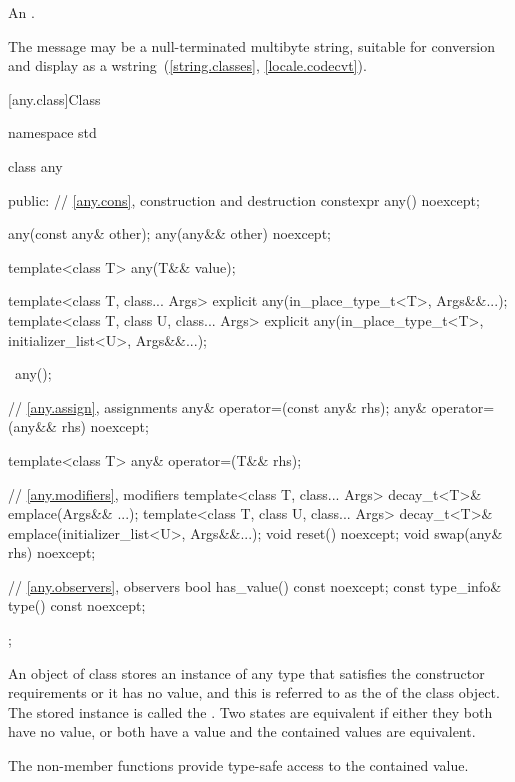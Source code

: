 \begin{itemdescr}
\pnum
\returns An  \ntbs{}.

\pnum
\remarks
The message may be a null-terminated multibyte string,
suitable for conversion and display as a wstring~(\ref{string.classes}, \ref{locale.codecvt}).
\end{itemdescr}

[any.class]{Class }

\begin{codeblock}
namespace std {
  class any {
  public:
    // \ref{any.cons}, construction and destruction
    constexpr any() noexcept;

    any(const any& other);
    any(any&& other) noexcept;

    template<class T>
      any(T&& value);

    template<class T, class... Args>
      explicit any(in_place_type_t<T>, Args&&...);
    template<class T, class U, class... Args>
      explicit any(in_place_type_t<T>, initializer_list<U>, Args&&...);

    ~any();

    // \ref{any.assign}, assignments
    any& operator=(const any& rhs);
    any& operator=(any&& rhs) noexcept;

    template<class T>
      any& operator=(T&& rhs);

    // \ref{any.modifiers}, modifiers
    template<class T, class... Args>
      decay_t<T>& emplace(Args&& ...);
    template<class T, class U, class... Args>
      decay_t<T>& emplace(initializer_list<U>, Args&&...);
    void reset() noexcept;
    void swap(any& rhs) noexcept;

    // \ref{any.observers}, observers
    bool has_value() const noexcept;
    const type_info& type() const noexcept;
  };
}
\end{codeblock}

\pnum
An object of class  stores an instance of any type that satisfies the constructor requirements or it has no value,
and this is referred to as the  of the class  object.
The stored instance is called the .
Two states are equivalent if either they both have no value, or both have a value and the contained values are equivalent.

\pnum
The non-member  functions provide type-safe access to the contained value.

